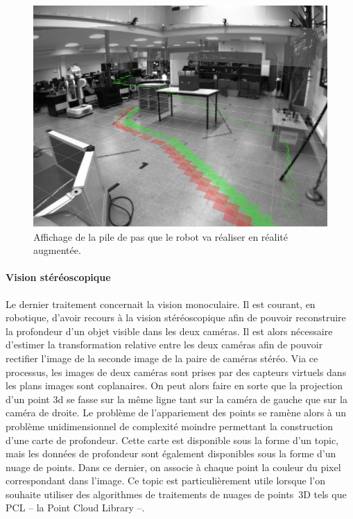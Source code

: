 \begin{figure}
  \begin{center}
    \includegraphics[width=.95\linewidth]{src/chap4-integration/footsteps2.jpg}
  \end{center}
  \caption{Affichage de la pile de pas que le robot va réaliser en
    réalité augmentée.}
\end{figure}



\paragraph{Vision stéréoscopique}


Le dernier traitement concernait la vision monoculaire. Il est
courant, en robotique, d'avoir recours à la vision stéréoscopique afin
de pouvoir reconstruire la profondeur d'un objet visible dans les deux
caméras. Il est alors nécessaire d'estimer la transformation relative
entre les deux caméras afin de pouvoir rectifier l'image de la seconde
image de la paire de caméras stéréo. Via ce processus, les images de
deux caméras sont prises par des capteurs virtuels dans les plans
images sont coplanaires. On peut alors faire en sorte que la
projection d'un point 3d se fasse sur la même ligne tant sur la caméra
de gauche que sur la caméra de droite. Le problème de l'appariement
des points se ramène alors à un problème unidimensionnel de complexité
moindre permettant la construction d'une carte de profondeur. Cette
carte est disponible sous la forme d'un topic, mais les données de
profondeur sont également disponibles sous la forme d'un nuage de
points. Dans ce dernier, on associe à chaque point la couleur du pixel
correspondant dans l'image. Ce topic est particulièrement utile
lorsque l'on souhaite utiliser des algorithmes de traitements de
nuages de points 3D tels que PCL -- la Point Cloud Library
--.


